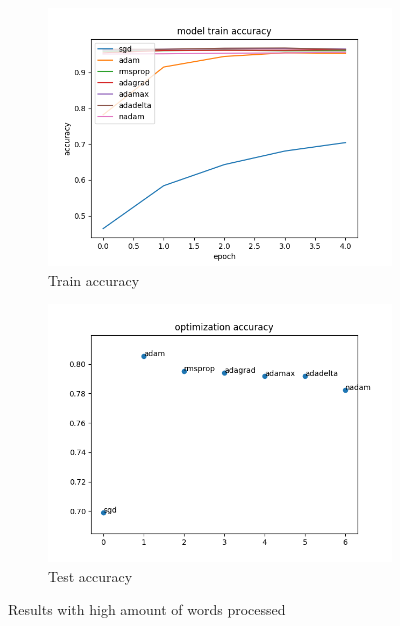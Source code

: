\documentclass{article}
\begin{document}
\begin{figure}[H]
    \centering
    \begin{subfigure}[b]{0.7\textwidth}
        \includegraphics[width=\textwidth]{high_maxword_total_train_accuracy.png}
        \caption{Train accuracy}
        \label{fig:tahmw}
    \end{subfigure}
    \begin{subfigure}[b]{0.7\textwidth}
        \includegraphics[width=\textwidth]{high_maxword_total_opt_acc.png}
        \caption{Test accuracy}
        \label{fig:teahmw}
    \end{subfigure}
    \caption{Results with high amount of words processed}\label{fig:rhmw}
\end{figure}
\end{document}
